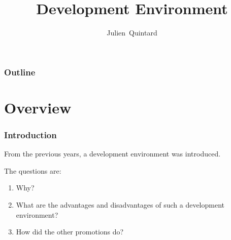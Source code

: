 
%
%



%
%

\title{Development Environment}

%
%

\author
{
  Julien~Quintard
}

%
%



%
%

\begin{frame}
  \titlepage

  \begin{center}
    \logos
  \end{center}
\end{frame}

%
%

\begin{frame}
  \frametitle{Outline}
  \tableofcontents
\end{frame}

%
%

\section{Overview}


\begin{frame}
  \frametitle{Introduction}

  From the previous years, a development environment was introduced.

  \nl

  The questions are:

  \begin{enumerate}[<+->]
    \item
      Why?
    \item
      What are the advantages and disadvantages of such a
      development environment?
    \item
      How did the other promotions do?
  \end{enumerate}
\end{frame}

